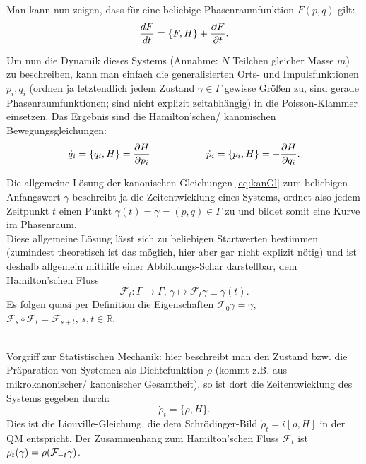 Man kann nun zeigen, dass für eine beliebige Phasenraumfunktion $F(p,q)$ gilt:
\begin{equation}\label{key}
\dv{F}{t} = \{F,H\} + \pdv{F}{t} .
\end{equation}

Um nun die Dynamik dieses Systems (Annahme: $N$ Teilchen gleicher Masse $m$) zu beschreiben, kann man einfach die generalisierten Orts- und Impulsfunktionen $p_i, q_i$ (ordnen ja letztendlich jedem Zustand $\gamma \in \Gamma$ gewisse Größen zu, sind gerade Phasenraumfunktionen; sind nicht explizit zeitabhängig) in die Poisson-Klammer einsetzen. Das Ergebnis sind die Hamilton'schen/ kanonischen Bewegungsgleichungen:
\begin{equation}\label{eq:kanGl}
\dot{q}_i = \{q_i, H\} = \pdv{H}{p_i} \hspace{2cm} \dot{p}_i = \{p_i, H\} = -\pdv{H}{q_i} .
\end{equation}


Die allgemeine Lösung der kanonischen Gleichungen \eqref{eq:kanGl} zum beliebigen Anfangswert $\gamma$ beschreibt ja die Zeitentwicklung eines Systems, ordnet also jedem Zeitpunkt $t$ einen Punkt $\gamma(t) = \tilde{\gamma} = (p,q) \in \Gamma$ zu und bildet somit eine Kurve im Phasenraum.\\
Diese allgemeine Lösung lässt sich zu beliebigen Startwerten bestimmen (zumindest theoretisch ist das möglich, hier aber gar nicht explizit nötig) und ist deshalb allgemein mithilfe einer Abbildungs-Schar darstellbar, dem Hamilton'schen Fluss
\begin{equation}\label{key}
\mathcal{F}_t : \Gamma \rightarrow \Gamma, \, \gamma \mapsto \mathcal{F}_t \gamma \equiv \gamma(t) .
\end{equation}
Es folgen quasi per Definition die Eigenschaften $\mathcal{F}_0 \gamma = \gamma$, $\mathcal{F}_s \circ \mathcal{F}_t = \mathcal{F}_{s+t}, \, s,t \in \mathbb{R}$.

	\\

Vorgriff zur Statistischen Mechanik: hier beschreibt man den Zustand bzw. die Präparation von Systemen als Dichtefunktion $\rho$ (kommt z.B. aus mikrokanonischer/ kanonischer Gesamtheit), so ist dort die Zeitentwicklung des Systems gegeben durch:
\begin{equation}\label{key}
\dot{\rho}_t = \{\rho, H\} .
\end{equation}
Dies ist die Liouville-Gleichung, die dem Schrödinger-Bild $\dot{\rho}_t = i [\rho, H]$ in der QM entspricht. Der Zusammenhang zum Hamilton'schen Fluss $\mathcal{F}_t$ ist $\rho_t(\gamma) = \rho\qty(\mathcal{F}_{-t} \gamma)$.\\

